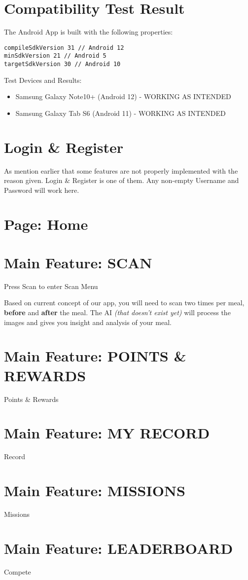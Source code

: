 \documentclass[a4paper,12pt]{article}
\begin{document}
\section*{Compatibility Test Result}

\noindent
The Android App is built with the following properties:
\begin{lstlisting}
compileSdkVersion 31 // Android 12
minSdkVersion 21 // Android 5
targetSdkVersion 30 // Android 10
\end{lstlisting}

\noindent
Test Devices and Results:
\begin{itemize}
    \item Samsung Galaxy Note10+ (Android 12) - WORKING AS INTENDED
    \item Samsung Galaxy Tab S6 (Android 11) - WORKING AS INTENDED
\end{itemize}

\section{Login \& Register}

As mention earlier that some features are not properly implemented with the reason given.
Login \& Register is one of them.
Any non-empty Username and Password will work here.

\section{Page: Home}


\section{Main Feature: SCAN}

\noindent
Press Scan to enter Scan Menu


Based on current concept of our app, you will need to scan two times per meal,
\textbf{before} and \textbf{after} the meal. The AI \textit{(that doesn't exist yet)} will
process the images and gives you insight and analysis of your meal.

\section{Main Feature: POINTS \& REWARDS}

Points \& Rewards


\section{Main Feature: MY RECORD}

Record


\section{Main Feature: MISSIONS}

Missions

\section{Main Feature: LEADERBOARD}

Compete
\end{document}
